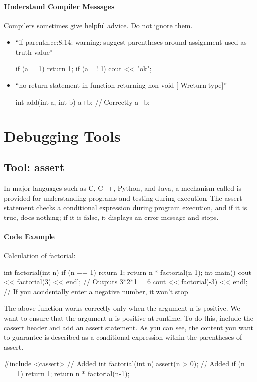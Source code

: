\paragraph{Understand Compiler Messages} Compilers sometimes give helpful advice. Do not ignore them.
  \begin{itemize}
  \item ``if-parenth.cc:8:14: warning: suggest parentheses around assignment used as truth value''
\begin{cbox}
  if (a = 1) return 1;
  if (a =! 1) cout << "ok";
\end{cbox}
\item ``no return statement in function returning non-void [-Wreturn-type]''
\begin{cbox}
int add(int a, int b) {
  a+b; // Correctly  a+b;
}
\end{cbox}
  \end{itemize}
\section{Debugging Tools}

\subsection{Tool: assert}

In major languages such as C, C++, Python, and Java, a mechanism called  is provided for understanding programs and testing during execution.
The assert statement checks a conditional expression during program execution, and if it is true, does nothing; if it is false, it displays an error message and stops.

\paragraph{Code Example}
Calculation of factorial:
\begin{cbox}[emph={factorial}]
int factorial(int n) {
  if (n == 1)
    return 1;
  return n * factorial(n-1);
}
int main() {
  cout << factorial(3) << endl; // Outputs 3*2*1 = 6
  cout << factorial(-3) << endl; // If you accidentally enter a negative number, it won't stop
}
\end{cbox}

The above function works correctly only when the argument n is positive.
We want to ensure that the argument n is positive at runtime. To do this, include the cassert header and add an assert statement. As you can see, the content you want to guarantee is described as a conditional expression within the parentheses of assert.
\begin{cbox}[emph={cassert,assert}]
#include <cassert> // Added
int factorial(int n) {
  assert(n > 0); // Added
  if (n == 1)
    return 1;
  return n * factorial(n-1);
}
\end{cbox}

